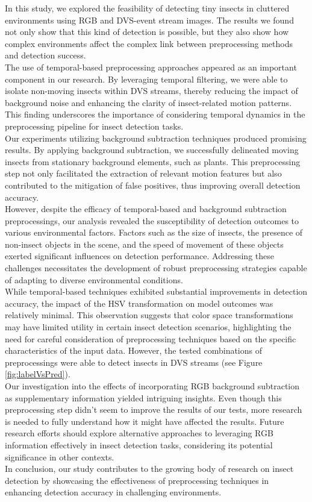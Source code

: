 \documentclass[sigchi,screen]{acmart}
\begin{document}
In this study, we explored the feasibility of detecting tiny insects in cluttered environments using RGB and DVS-event stream images. The results we found not only show that this kind of detection is possible, but they also show how complex environments affect the complex link between preprocessing methods and detection success.\\
The use of temporal-based preprocessing approaches appeared as an important component in our research. By leveraging temporal filtering, we were able to isolate non-moving insects within DVS streams, thereby reducing the impact of background noise and enhancing the clarity of insect-related motion patterns. This finding underscores the importance of considering temporal dynamics in the preprocessing pipeline for insect detection tasks.\\
Our experiments utilizing background subtraction techniques produced promising results. By applying background subtraction, we successfully delineated moving insects from stationary background elements, such as plants. This preprocessing step not only facilitated the extraction of relevant motion features but also contributed to the mitigation of false positives, thus improving overall detection accuracy.\\
However, despite the efficacy of temporal-based and background subtraction preprocessings, our analysis revealed the susceptibility of detection outcomes to various environmental factors. Factors such as the size of insects, the presence of non-insect objects in the scene, and the speed of movement of these objects exerted significant influences on detection performance. Addressing these challenges necessitates the development of robust preprocessing strategies capable of adapting to diverse environmental conditions.\\
While temporal-based techniques exhibited substantial improvements in detection accuracy, the impact of the HSV transformation on model outcomes was relatively minimal. This observation suggests that color space transformations may have limited utility in certain insect detection scenarios, highlighting the need for careful consideration of preprocessing techniques based on the specific characteristics of the input data. However, the tested combinations of preprocessings were able to detect insects in DVS streams (see Figure \ref{fig:labelVsPred}).\\
Our investigation into the effects of incorporating RGB background subtraction as supplementary information yielded intriguing insights. Even though this preprocessing step didn't seem to improve the results of our tests, more research is needed to fully understand how it might have affected the results. Future research efforts should explore alternative approaches to leveraging RGB information effectively in insect detection tasks, considering its potential significance in other contexts.\\
In conclusion, our study contributes to the growing body of research on insect detection by showcasing the effectiveness of preprocessing techniques in enhancing detection accuracy in challenging environments.
\end{document}
